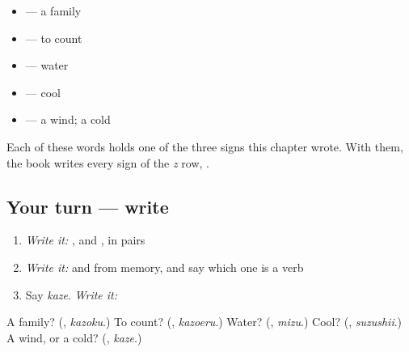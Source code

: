 \begin{itemize}
\raggedright
  \item \textbf{} — a family
  \item \textbf{} — to count
  \item \textbf{} — water
  \item \textbf{} — cool
  \item \textbf{} — a wind; a cold
\end{itemize}

Each of these words holds one of the three signs this chapter wrote. With them, the book writes every sign of the \emph{z} row, \textbf{    }.

\subsection*{Your turn — write}
\begin{enumerate}
\raggedright
  \item \emph{Write it:} \textbf{ }, \textbf{ } and \textbf{ }, in pairs
  \item \emph{Write it:} \textbf{} and \textbf{} from memory, and say which one is a verb
  \item Say \emph{kaze}. \emph{Write it:} \textbf{}
\end{enumerate}

\begin{tcolorbox}[breakable,colback=teal!4,colframe=teal!35!black,title={Before you move on}]
A family? (\textbf{}, \emph{kazoku}.) To count? (\textbf{}, \emph{kazoeru}.) Water? (\textbf{}, \emph{mizu}.) Cool? (\textbf{}, \emph{suzushii}.) A wind, or a cold? (\textbf{}, \emph{kaze}.)
\end{tcolorbox}
